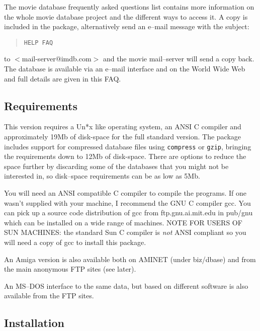 The movie database frequently asked questions list contains more 
information
on the whole movie database project and the different ways to access it. A 
copy is included in the package, alternatively send an e--mail message 
with the
subject:
\begin{quote}
{\tt HELP FAQ}
\end{quote}
to $<$mail-server@imdb.com$>$ and the movie mail--server will send a copy 
back. 
The database is available via an e--mail interface and on the World Wide 
Web and
full details are given in this FAQ.

\subsection{Requirements}

This version requires a Un*x like operating system, an ANSI C compiler and 
approximately 19Mb of disk-space for the full standard version. The package  
includes support for compressed database files using {\tt compress} or 
{\tt gzip}, 
bringing the requirements down to 12Mb of disk-space. There are options to
reduce the space further by discarding some of the databases that you might
not be interested in, so disk--space requirements can be as low as 5Mb.

You will need an ANSI compatible C compiler to compile the programs. If 
one 
wasn't supplied with your machine, I recommend the GNU C compiler gcc. 
You can pick up a source code distribution of gcc from ftp.gnu.ai.mit.edu
in pub/gnu which can be installed on a wide range of machines. NOTE FOR
USERS OF SUN MACHINES: the standard Sun C compiler is {\em not} ANSI 
compliant
so you will need a copy of gcc to install this package.

An Amiga version is also available both on AMINET (under biz/dbase) and 
from
the main anonymous FTP sites (see later).

An MS--DOS interface to the same data, but based on different software is 
also 
available from the FTP sites.

\subsection{\label{instl}Installation}

